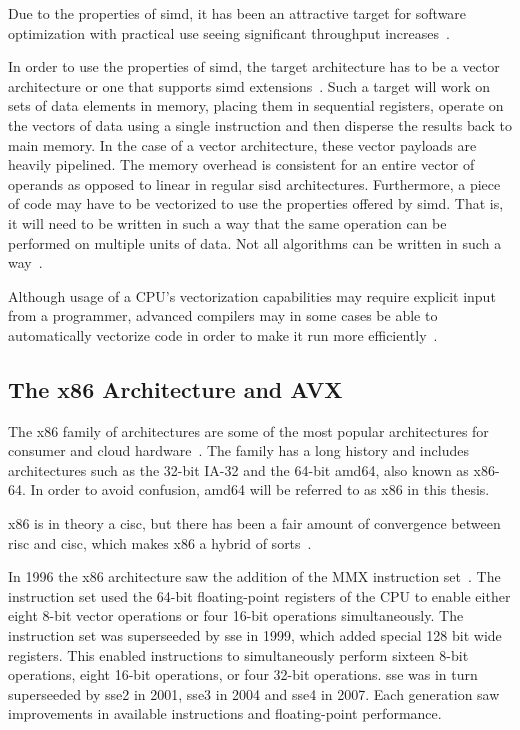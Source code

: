 \noindent Due to the properties of \gls{simd}, it has been an attractive target for software optimization with practical use seeing significant throughput increases~\cite{dickson2011}.

In order to use the properties of \gls{simd}, the target architecture has to be a vector architecture or one that supports \gls{simd} extensions~\cite{hennessy2011:vectorization}. Such a target will work on sets of data elements in memory, placing them in sequential registers, operate on the vectors of data using a single instruction and then disperse the results back to main memory. In the case of a vector architecture, these vector payloads are heavily pipelined. The memory overhead is consistent for an entire vector of operands as opposed to linear in regular \gls{sisd} architectures. Furthermore, a piece of code may have to be vectorized to use the properties offered by \gls{simd}. That is, it will need to be written in such a way that the same operation can be performed on multiple units of data. Not all algorithms can be written in such a way~\cite{dickson2011}.

Although usage of a CPU's vectorization capabilities may require explicit input from a programmer, advanced compilers may in some cases be able to automatically vectorize code in order to make it run more efficiently~\cite{dickson2011}.

\subsection{The x86 Architecture and AVX}

The \gls{x86} family of architectures are some of the most popular architectures for consumer and cloud hardware~\cite{carter2002}. The family has a long history and includes architectures such as the 32-bit IA-32 and the 64-bit amd64, also known as x86-64. In order to avoid confusion, amd64 will be referred to as \gls{x86} in this thesis.

\gls{x86} is in theory a \gls{cisc}, but there has been a fair amount of convergence between \gls{risc} and \gls{cisc}, which makes \gls{x86} a hybrid of sorts~\cite{carter2002}.

In 1996 the \gls{x86} architecture saw the addition of the MMX instruction set~\cite{hennessy2011:avx}. The instruction set used the 64-bit floating-point registers of the CPU to enable either eight 8-bit vector operations or four 16-bit operations simultaneously. The instruction set was superseeded by \gls{sse} in 1999, which added special 128 bit wide registers. This enabled instructions to simultaneously perform sixteen 8-bit operations, eight 16-bit operations, or four 32-bit operations. \gls{sse} was in turn superseeded by \gls{sse}2 in 2001, \gls{sse}3 in 2004 and \gls{sse}4 in 2007. Each generation saw improvements in available instructions and floating-point performance.

